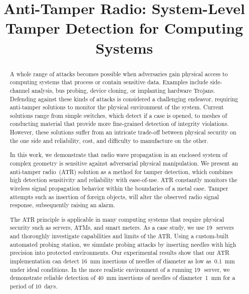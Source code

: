 \documentclass[conference]{IEEEtran}
\newcommand{\inch}{\,\textquotedbl}
\begin{document}
\title{Anti-Tamper Radio: System-Level Tamper Detection for Computing Systems}

\author{
}


\maketitle




\begin{abstract}
A whole range of attacks becomes possible when adversaries gain physical access to computing systems that process or contain sensitive data. Examples include side-channel analysis, bus probing, device cloning, or implanting hardware Trojans. Defending against these kinds of attacks is considered a challenging endeavor, requiring anti-tamper solutions to monitor the physical environment of the system. Current solutions range from simple switches, which detect if a case is opened, to meshes of conducting material that provide more fine-grained detection of integrity violations. However, these solutions suffer from an intricate trade-off between physical security on the one side and reliability, cost, and difficulty to manufacture on the other.

In this work, we demonstrate that radio wave propagation in an enclosed system of complex geometry is sensitive against adversarial physical manipulation. We present an anti-tamper radio~(ATR) solution as a method for tamper detection, which combines high detection sensitivity and reliability with ease-of-use. ATR constantly monitors the wireless signal propagation behavior within the boundaries of a metal case. Tamper attempts such as insertion of foreign objects, will alter the observed radio signal response, subsequently raising an alarm.

The ATR principle is applicable in many computing systems that require physical security such as servers, ATMs, and smart meters. As a case study, we use $19$\inch~servers and thoroughly investigate capabilities and limits of the ATR. Using a custom-built automated probing station, we simulate probing attacks by inserting needles with high precision into protected environments. Our experimental results show that our ATR implementation can detect \SI{16}{\mm} insertions of needles of diameter as low as~\SI{0.1}{\mm} under ideal conditions. In the more realistic environment of a running $19$\inch~server, we demonstrate reliable detection of \SI{40}{\mm} insertions of needles of diameter~\SI{1}{\mm} for a period of $10$~days.

\end{abstract}
\end{document}
